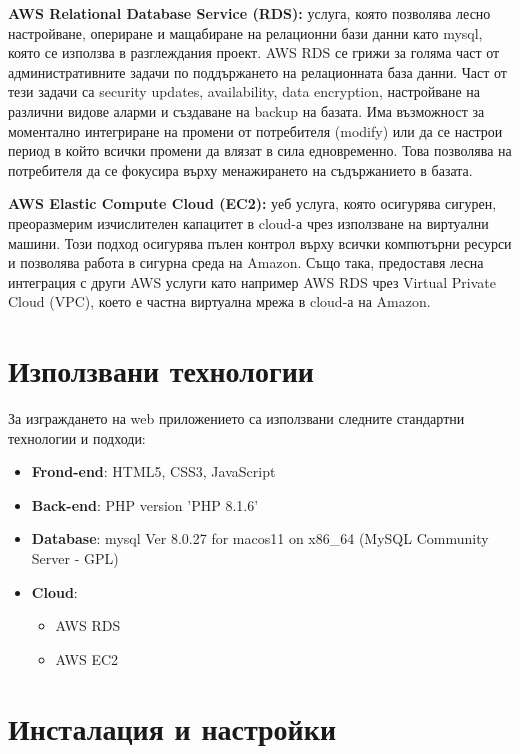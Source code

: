 \documentclass[12pt]{article}
\begin{document}
\noindent \textbf{AWS Relational Database Service (RDS):} услуга, която позволява лесно настройване, опериране и мащабиране на релационни бази данни като mysql, която се използва в разглеждания проект. AWS RDS се грижи за голяма част от административните задачи по поддържането на релационната база данни. Част от тези задачи са security updates, availability, data encryption, настройване на различни видове аларми и създаване на backup на базата. Има възможност за моментално интегриране на промени от потребителя (modify) или да се настрои период в който всички промени да влязат в сила едновременно. Това позволява на потребителя да се фокусира върху менажирането на съдържанието в базата.
\medskip

\noindent \textbf{AWS Elastic Compute Cloud (EC2):} уеб услуга, която осигурява сигурен, преоразмерим изчислителен капацитет в cloud-а чрез използване на виртуални машини. Този подход осигурява пълен контрол върху всички компютърни ресурси и позволява работа в сигурна среда на Amazon. Също така, предоставя лесна интеграция с други AWS услуги като например AWS RDS чрез Virtual Private Cloud (VPC), което е частна виртуална мрежа в cloud-а на Amazon.
\medskip

\section{Използвани технологии}
\noindent За изграждането на web приложението са използвани следните стандартни технологии и подходи:

\begin{itemize}
\item \textbf{Frond-end}: HTML5, CSS3, JavaScript
\item \textbf{Back-end}: PHP version 'PHP 8.1.6'
\item \textbf{Database}:  mysql Ver 8.0.27 for macos11 on x86\_64 (MySQL Community Server - GPL)
\item \textbf{Cloud}:
\begin{itemize}
\item AWS RDS
\item AWS EC2
\end{itemize}
\end{itemize}


\section{Инсталация и настройки}
\end{document}
